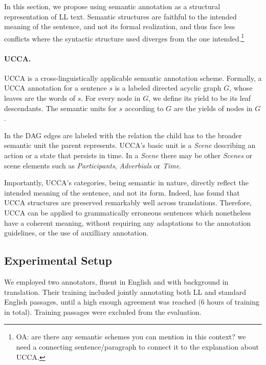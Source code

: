 \documentclass[letter,11pt]{article}
\newcommand{\oa}[1]{\footnote{\color{red}OA: #1}}
\begin{document}
		In this section, we propose using semantic annotation as a structural
		representation of LL text. Semantic structures are faithful to the intended
		meaning of the sentence, and not its formal realization, and thus face
		less conflicts where the syntactic structure used diverges from
		the one intended.\oa{are there any semantic schemes you can mention in this context? we need
			a connecting sentence/paragraph to connect it to the explanation about UCCA.}
		
		
		\paragraph{UCCA.}\label{sec:ucca}
		
		UCCA is a cross-linguistically applicable semantic annotation scheme. Formally, 
		a UCCA annotation for a sentence $s$ is a labeled directed acyclic graph $G$, whose
		leaves are the words of $s$. For every node in $G$,
		we define its yield to be its leaf descendants. The
		semantic units for $s$ according to $G$ are the yields
		of nodes in $G$.
		
		In the DAG edges are labeled with the relation the child has to the broader semantic unit
		the parent represents. UCCA's basic unit is a \textit{Scene} describing an action or a state
		that persists in time. In a \textit{Scene} there may be other \textit{Scenes} or scene elements
		such as \textit{Participants}, \textit{Adverbials} or \textit{Time}.
		
		Importantly, UCCA's categories, being semantic in nature, directly reflect the intended
		meaning of the sentence, and not its form. Indeed,  has found
		that UCCA structures are preserved remarkably well across translations.
		Therefore, UCCA can be applied to grammatically erroneous
		sentences which nonetheless have a coherent meaning, without requiring any adaptations
		to the annotation guidelines, or the use of auxilliary annotation.
		
		
		\subsection{Experimental Setup}
		
		We employed two annotators, fluent in English and with background in translation.
		Their training included jointly annotating both LL and standard English
		passages, until a high enough agreement was reached (6 hours of training in total).
		Training passages were excluded from the evaluation.
		
\end{document}
